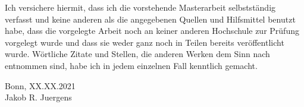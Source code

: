 \documentclass[11pt,twoside,a4paper]{article}
\theoremstyle{MAstyle} \newtheorem{assumption}{Assumption}
\theoremstyle{MAstyle} \newtheorem{definition}{Definition}
\begin{document}
		\vspace{3cm}
		
		Ich versichere hiermit, dass ich die vorstehende Masterarbeit
		selbstständig verfasst und keine anderen als die angegebenen Quellen
		und Hilfsmittel benutzt habe, dass die vorgelegte Arbeit noch an keiner
		anderen Hochschule zur Prüfung vorgelegt wurde und dass sie weder
		ganz noch in Teilen bereits veröffentlicht wurde. Wörtliche Zitate und
		Stellen, die anderen Werken dem Sinn nach entnommen sind, habe ich
		in jedem einzelnen Fall kenntlich gemacht.
		
		\vspace{2cm}
		Bonn, XX.XX.2021 \hrulefill \\
		\hspace*{0mm}Jakob R. Juergens
		
		\vspace{\fill}
\end{document}
